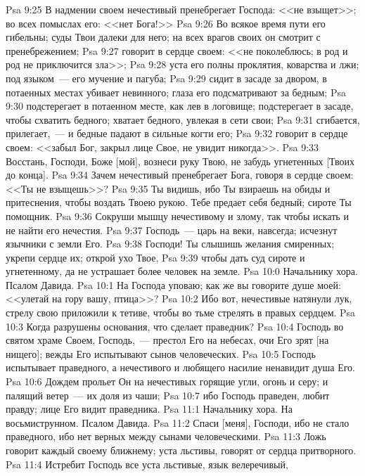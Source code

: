 \vs Psa 9:25 В надмении своем нечестивый пренебрегает Господа: <<не взыщет>>; во всех помыслах его: <<нет Бога!>>
\vs Psa 9:26 Во всякое время пути его гибельны; суды Твои далеки для него; на всех врагов своих он смотрит с пренебрежением;
\vs Psa 9:27 говорит в сердце своем: <<не поколеблюсь; в род и род не приключится  зла>>;
\vs Psa 9:28 уста его полны проклятия, коварства и лжи; под языком~--- его мучение и пагуба;
\vs Psa 9:29 сидит в засаде за двором, в потаенных местах убивает невинного; глаза его подсматривают за бедным;
\vs Psa 9:30 подстерегает в потаенном месте, как лев в логовище; подстерегает в засаде, чтобы схватить бедного; хватает бедного, увлекая в сети свои;
\vs Psa 9:31 сгибается, прилегает,~--- и бедные падают в сильные когти его;
\vs Psa 9:32 говорит в сердце своем: <<забыл Бог, закрыл лице Свое, не увидит никогда>>.
\vs Psa 9:33 Восстань, Господи, Боже [мой], вознеси руку Твою, не забудь угнетенных [Твоих до конца].
\vs Psa 9:34 Зачем нечестивый пренебрегает Бога, говоря в сердце своем: <<Ты не взыщешь>>?
\vs Psa 9:35 Ты видишь, ибо Ты взираешь на обиды и притеснения, чтобы воздать Твоею рукою. Тебе предает себя бедный; сироте Ты помощник.
\vs Psa 9:36 Сокруши мышцу нечестивому и злому, так чтобы искать и не найти его нечестия.
\vs Psa 9:37 Господь~--- царь на веки, навсегда; исчезнут язычники с земли Его.
\vs Psa 9:38 Господи! Ты слышишь желания смиренных; укрепи сердце их; открой ухо Твое,
\vs Psa 9:39 чтобы дать суд сироте и угнетенному, да не устрашает более человек на земле.
\vs Psa 10:0 Начальнику хора. Псалом Давида.
\rsbpar\vs Psa 10:1 На Господа уповаю; как же вы говорите душе моей: <<улетай на гору вашу,  птица>>?
\vs Psa 10:2 Ибо вот, нечестивые натянули лук, стрелу свою приложили к тетиве, чтобы во тьме стрелять в правых сердцем.
\vs Psa 10:3 Когда разрушены основания, что сделает праведник?
\vs Psa 10:4 Господь во святом храме Своем, Господь,~--- престол Его на небесах, очи Его зрят [на нищего]; вежды Его испытывают сынов человеческих.
\vs Psa 10:5 Господь испытывает праведного, а нечестивого и любящего насилие ненавидит душа Его.
\vs Psa 10:6 Дождем прольет Он на нечестивых горящие угли, огонь и серу; и палящий ветер~--- их доля из чаши;
\vs Psa 10:7 ибо Господь праведен, любит правду; лице Его видит праведника.
\vs Psa 11:1 Начальнику хора. На восьмиструнном. Псалом Давида.
\rsbpar\vs Psa 11:2 Спаси [меня], Господи, ибо не стало праведного, ибо нет верных между сынами человеческими.
\vs Psa 11:3 Ложь говорит каждый своему ближнему; уста льстивы, говорят от сердца притворного.
\vs Psa 11:4 Истребит Господь все уста льстивые, язык велеречивый,
